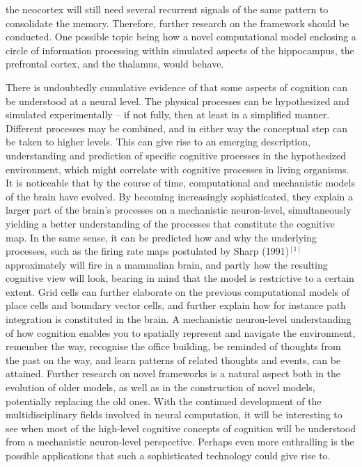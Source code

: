 the neocortex will still need several recurrent signals of the same pattern to consolidate the memory. Therefore, further research on the framework should be conducted. One possible topic being how a novel computational model enclosing a circle of information processing within simulated aspects of the hippocampus, the prefrontal cortex, and the thalamus, would behave.

There is undoubtedly cumulative evidence of that some aspects of cognition can be understood at a neural level. The physical processes can be hypothesized and simulated experimentally – if not fully, then at least in a simplified manner. Different processes may be combined, and in either way the conceptual step can be taken to higher levels. This can give rise to an emerging description, understanding and prediction of specific cognitive processes in the hypothesized environment, which might correlate with cognitive processes in living organisms. It is noticeable that by the course of time, computational and mechanistic models of the brain have evolved. By becoming increasingly sophisticated, they explain a larger part of the brain’s processes on a mechanistic neuron-level, simultaneously yielding a better understanding of the processes that constitute the cognitive map. In the same sense, it can be predicted how and why the underlying processes, such as the firing rate maps postulated by Sharp (1991)$^{[1]}$ approximately will fire in a mammalian brain, and partly how the resulting cognitive view will look, bearing in mind that the model is restrictive to a certain extent. Grid cells can further elaborate on the previous computational models of place cells and boundary vector cells, and further explain how for instance path integration is constituted in the brain. A mechanistic neuron-level understanding of how cognition enables you to spatially represent and navigate the environment, remember the way, recognise the office building, be reminded of thoughts from the past on the way, and learn patterns of related thoughts and events, can be attained. Further research on novel frameworks is a natural aspect both in the evolution of older models, as well as in the construction of novel models, potentially replacing the old ones. With the continued development of the multidisciplinary fields involved in neural computation, it will be interesting to see when most of the high-level cognitive concepts of cognition will be understood from a mechanistic neuron-level perspective.  Perhaps even more enthralling is the possible applications that such a sophisticated technology could give rise to.
\\

